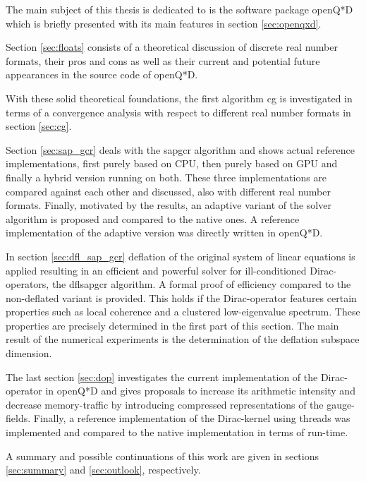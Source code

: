 \documentclass{article}
\theoremstyle{plain} %
\theoremstyle{convention} %
\theoremstyle{remark} %
\numberwithin{equation}{section}
\begin{document}
The main subject of this thesis is dedicated to is the software package openQ*D which is briefly presented with its main features in section \ref{sec:openqxd}.

Section \ref{sec:floats} consists of a theoretical discussion of discrete real number formats, their pros and cons as well as their current and potential future appearances in the source code of openQ*D.

With these solid theoretical foundations, the first algorithm \acrlong{cg} is investigated in terms of a convergence analysis with respect to different real number formats in section \ref{sec:cg}.

Section \ref{sec:sap_gcr} deals with the \acrlong{sapgcr} algorithm and shows actual reference implementations, first purely based on CPU, then purely based on GPU and finally a hybrid version running on both. These three implementations are compared against each other and discussed, also with different real number formats. Finally, motivated by the results, an adaptive variant of the solver algorithm is proposed and compared to the native ones. A reference implementation of the adaptive version was directly written in openQ*D.

In section \ref{sec:dfl_sap_gcr} deflation of the original system of linear equations is applied resulting in an efficient and powerful solver for ill-conditioned Dirac-operators, the \acrlong{dflsapgcr} algorithm. A formal proof of efficiency compared to the non-deflated variant is provided. This holds if the Dirac-operator features certain properties such as local coherence and a clustered low-eigenvalue spectrum. These properties are precisely determined in the first part of this section. The main result of the numerical experiments is the determination of the deflation subspace dimension.

The last section \ref{sec:dop} investigates the current implementation of the Dirac-operator in openQ*D and gives proposals to increase its arithmetic intensity and decrease memory-traffic by introducing compressed representations of the gauge-fields. Finally, a reference implementation of the Dirac-kernel using threads was implemented and compared to the native implementation in terms of run-time.

A summary and possible continuations of this work are given in sections \ref{sec:summary} and \ref{sec:outlook}, respectively.
\end{document}

